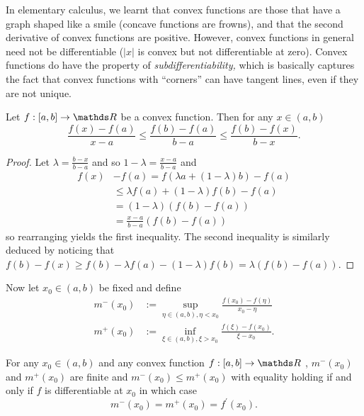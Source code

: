 In elementary calculus, we learnt that convex functions are those
that have a graph shaped like a smile (concave functions are frowns),
and that the second derivative of convex functions are positive. However,
convex functions in general need not be differentiable ($\lvert x\rvert$
is convex but not differentiable at zero). Convex functions do have
the property of \emph{subdifferentiability, }which is basically captures
the fact that convex functions with ``corners'' can have tangent
lines, even if they are not unique.
\begin{lem}
\label{lem:convexTangents}Let $f:\left[a,b\right]\to\R$ be a convex
function. Then for any $x\in\left(a,b\right)$
\[
\frac{f\left(x\right)-f\left(a\right)}{x-a}\leq\frac{f\left(b\right)-f\left(a\right)}{b-a}\leq\frac{f\left(b\right)-f\left(x\right)}{b-x}.
\]
\end{lem}

\begin{proof}
Let $\lambda=\frac{b-x}{b-a}$ and so $1-\lambda=\frac{x-a}{b-a}$
and 
\begin{align*}
f\left(x\right) & -f\left(a\right)=f\left(\lambda a+\left(1-\lambda\right)b\right)-f\left(a\right)\\
 & \leq\lambda f\left(a\right)+\left(1-\lambda\right)f\left(b\right)-f\left(a\right)\\
 & =\left(1-\lambda\right)\left(f\left(b\right)-f\left(a\right)\right)\\
 & =\frac{x-a}{b-a}\left(f\left(b\right)-f\left(a\right)\right)
\end{align*}
so rearranging yields the first inequality. The second inequality
is similarly deduced by noticing that $f\left(b\right)-f\left(x\right)\geq f\left(b\right)-\lambda f\left(a\right)-\left(1-\lambda\right)f\left(b\right)=\lambda\left(f\left(b\right)-f\left(a\right)\right)$.
\end{proof}
Now let $x_{0}\in\left(a,b\right)$ be fixed and define
\begin{align*}
m^{-}\left(x_{0}\right) & :=\sup_{\eta\in\left(a,b\right),\eta<x_{0}}\frac{f\left(x_{0}\right)-f\left(\eta\right)}{x_{0}-\eta}\\
m^{+}\left(x_{0}\right) & :=\inf_{\xi\in\left(a,b\right),\xi>x_{0}}\frac{f\left(\xi\right)-f\left(x_{0}\right)}{\xi-x_{0}}.
\end{align*}

\begin{prop}
\label{prop:convexLeftRightDerivative}For any $x_{0}\in\left(a,b\right)$
and any convex function $f:\left[a,b\right]\to\R$ , $m^{-}\left(x_{0}\right)$
and $m^{+}\left(x_{0}\right)$ are finite and $m^{-}\left(x_{0}\right)\leq m^{+}\left(x_{0}\right)$
with equality holding if and only if $f$ is differentiable at $x_{0}$
in which case 
\[
m^{-}\left(x_{0}\right)=m^{+}\left(x_{0}\right)=f^{\prime}\left(x_{0}\right).
\]
\end{prop}

